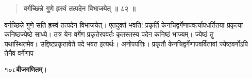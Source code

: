 \documentclass[11pt, openany]{book}
\begin{document}
\begin{sloppypar}
\begin{quote}
\hspace{0.5in}\textbf{वर्गच्छिन्ने गुणे ह्रस्वं तत्पदेन विभाजयेत् ॥ ८२ ॥}
\end{quote}

\hangindent=0.2in \hspace{0.2in}वर्गच्छिन्ने गुणे सति ह्रस्वं तत्पदेन विभाजयेत्। एतदुक्तं भवति! प्रकृर्ति केनचिद्वर्गेणापवर्त्यापधर्तितया प्रकृत्या कनिष्ठज्येष्ठे साध्ये। तत्र येन वर्गेण प्रकृतेरपवर्तः कृतस्तस्य पदेन कनिष्ठं भाज्यम्। ज्येष्ठं तु यथास्थितमेव। उद्दिष्टप्रकृतावेते पदे भवत इत्यर्थः। अनोपपत्तिः। प्रकृतौ केनचिद्वर्गेणापवर्वितावां ज्येष्ठवर्गोऽपि तेनैव वर्गेणाप -
\end{sloppypar}
\thispagestyle{empty}
\newpage

\onehalfspacing
१०८\hspace{2in}\textbf{बीजगणितम्।}

\vspace{5mm}
\end{document}
